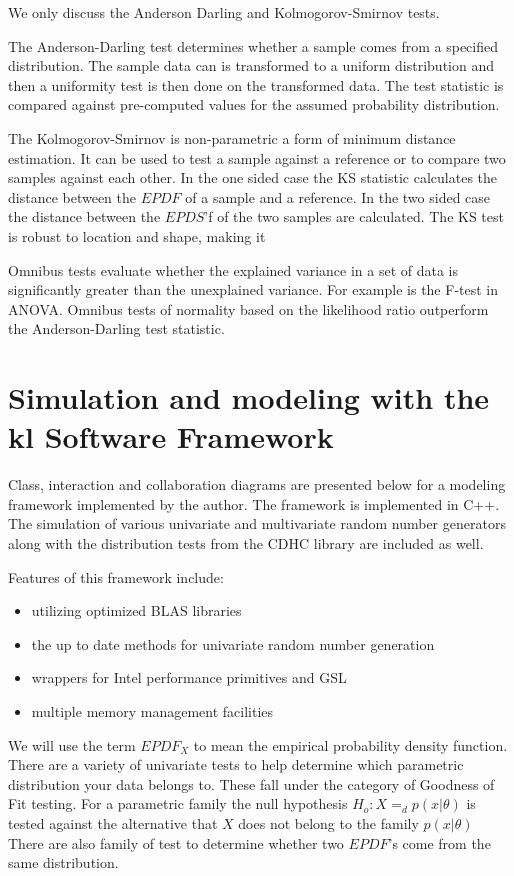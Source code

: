 We only discuss the Anderson Darling and Kolmogorov-Smirnov
tests.

The Anderson-Darling test determines whether a sample comes
from a specified distribution. The sample data can is
transformed to a uniform distribution and then a uniformity
test is then done on the transformed data. The test statistic
is compared against pre-computed values for the assumed
probability distribution.

The Kolmogorov-Smirnov is non-parametric a form of minimum
distance estimation.  It can be used to test a sample against a
reference or to compare two samples against each other.  In the
one sided case the KS statistic calculates the distance between
the $EPDF$ of a sample and a reference.  In the two sided case
the distance between the $EPDS$'f of the two samples are
calculated.  The KS test is robust to location and shape,
making it

Omnibus tests evaluate whether the explained variance in a set
of data is significantly greater than the unexplained variance.
For example is the F-test in ANOVA. Omnibus tests of normality
based on the likelihood ratio outperform the Anderson-Darling
test statistic.

\section{Simulation and modeling with the kl Software
Framework}

Class, interaction and collaboration diagrams are presented
below for a modeling framework implemented by the author. The
framework is implemented in C++.  The simulation of various
univariate and multivariate random number generators along with
the distribution tests from the CDHC library are included as
well.

Features of this framework include: \begin{itemize}
\item utilizing optimized BLAS libraries
\item the up to date methods for univariate random number
    generation
\item wrappers for Intel performance primitives and GSL
\item multiple memory management facilities
\end{itemize}

We will use the term $EPDF_X$ to mean the empirical probability
density function. There are a variety of univariate tests to
help determine which parametric distribution your data belongs
to. These fall under the category of Goodness of Fit testing.
For a parametric family the null hypothesis $H_o : X=_d p(x|
\theta)$ is tested against the alternative that $X$ does not
belong to the family $p(x|\theta)$ There are also family of
test to determine whether two $EPDF$'s come from the same
distribution.
